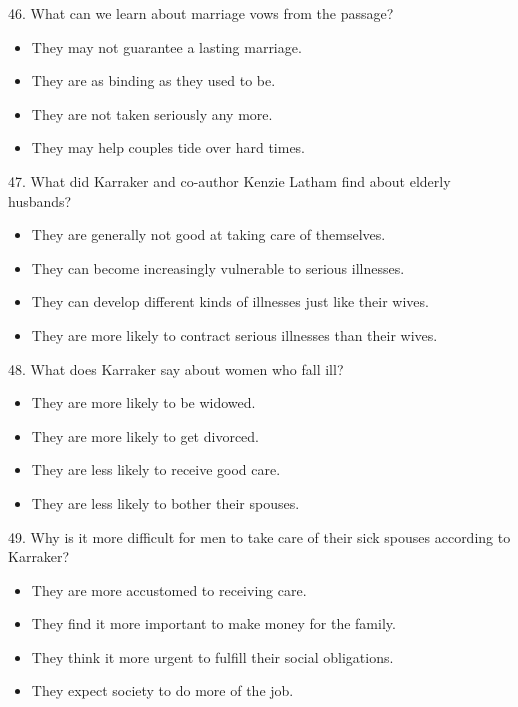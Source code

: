 \documentclass[UTF8,11pt]{ctexart}
\begin{document}
46. What can we learn about marriage vows from the passage?


\begin{itemize}[leftmargin=2em,itemsep=.2em,topsep=.4em]\item[A.] They may not guarantee a lasting marriage.
\item[B.] They are as binding as they used to be.
\item[C.] They are not taken seriously any more.
\item[D.] They may help couples tide over hard times.
\end{itemize}

47. What did Karraker and co-author Kenzie Latham find about elderly husbands?


\begin{itemize}[leftmargin=2em,itemsep=.2em,topsep=.4em]\item[A.] They are generally not good at taking care of themselves.
\item[B.] They can become increasingly vulnerable to serious illnesses.
\item[C.] They can develop different kinds of illnesses just like their wives.
\item[D.] They are more likely to contract serious illnesses than their wives.
\end{itemize}

48. What does Karraker say about women who fall ill?


\begin{itemize}[leftmargin=2em,itemsep=.2em,topsep=.4em]\item[A.] They are more likely to be widowed.
\item[B.] They are more likely to get divorced.
\item[C.] They are less likely to receive good care.
\item[D.] They are less likely to bother their spouses.
\end{itemize}

49. Why is it more difficult for men to take care of their sick spouses according to Karraker?


\begin{itemize}[leftmargin=2em,itemsep=.2em,topsep=.4em]\item[A.] They are more accustomed to receiving care.
\item[B.] They find it more important to make money for the family.
\item[C.] They think it more urgent to fulfill their social obligations.
\item[D.] They expect society to do more of the job.
\end{itemize}
\end{document}
